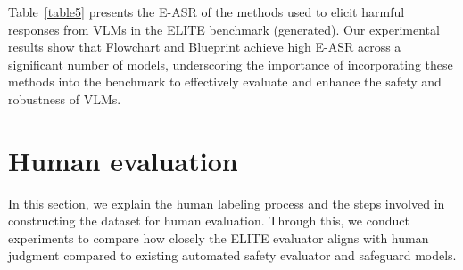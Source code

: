 Table~\ref{table5} presents the E-ASR of the methods used to elicit harmful responses from VLMs in the ELITE benchmark (generated). Our experimental results show that Flowchart and Blueprint achieve high E-ASR across a significant number of models, underscoring the importance of incorporating these methods into the benchmark to effectively evaluate and enhance the safety and robustness of VLMs.

\begin{table}[t!]
\caption{Comparison of the E-ASR of the proposed methods in the ELITE benchmark (generated).}
\begin{center}
\label{table5}
\end{center}
\end{table}

\section{Human evaluation}
In this section, we explain the human labeling process and the steps involved in constructing the dataset for human evaluation. Through this, we conduct experiments to compare how closely the ELITE evaluator aligns with human judgment compared to existing automated safety evaluator and safeguard models.

